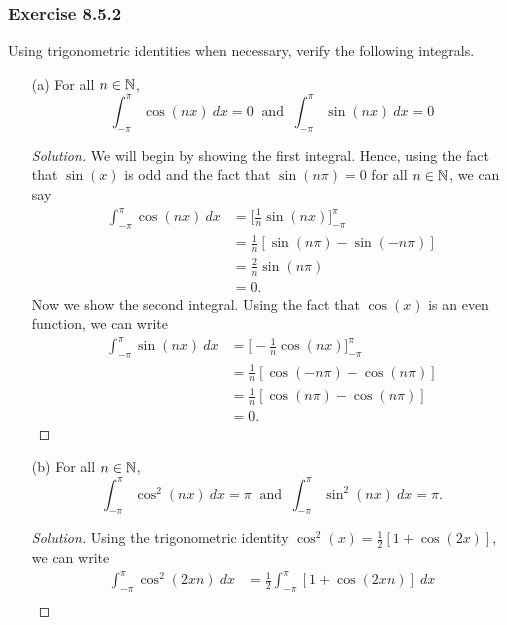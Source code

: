 \subsubsection{Exercise 8.5.2} Using trigonometric identities when necessary, verify the following integrals.
\begin{enumerate}
    \item[(a)] For all \( n \in \mathbb{N}  \), 
        \[  \int_{ - \pi  }^{ \pi  }  \cos(nx) \ dx = 0 \ \text{ and } \ \int_{ - \pi  }^{ \pi   } \sin(nx) \   dx = 0  \]
\begin{proof}[Solution]
    We will begin by showing the first integral. Hence, using the fact that \( \sin(x)  \) is odd and the fact that \( \sin(n \pi) = 0  \) for all \( n \in \mathbb{N}  \), we can say
    \begin{align*}
        \int_{ -\pi  }^{ \pi  } \cos(nx) \ dx &=  \Big[ \frac{ 1 }{ n }  \sin(nx)\Big]_{- \pi }^{\pi }  \\
                                              &= \frac{ 1 }{ n } [  \sin(n \pi ) - \sin(-n \pi)  ] \\
                                              &= \frac{ 2 }{ n }  \sin(n \pi) \\
                                              &= 0.
    \end{align*}
    Now we show the second integral. Using the fact that \( \cos(x) \) is an even function, we can write
    \begin{align*}
        \int_{ -\pi  }^{ \pi  } \sin(nx)  \ dx &= \Big[ -\frac{ 1 }{ n } \cos(nx) \Big]_{-\pi}^{\pi } \\
                                               &= \frac{ 1 }{ n } [  \cos(-n \pi) -\cos(n \pi)  ]  \\
                                               &= \frac{ 1 }{ n } [ \cos(n \pi) - \cos(n \pi )] \\
                                               &= 0.
    \end{align*}
\end{proof}
    \item[(b)] For all \( n \in \mathbb{N}  \),
        \[  \int_{ - \pi  }^{ \pi  }  \cos^{2}(nx) \ dx = \pi \ \text{ and } \ \int_{ - \pi  }^{ \pi   } \sin^{2}(nx) \   dx = \pi.  \]
        \begin{proof}[Solution]
            Using the trigonometric identity \( \cos^{2}(x) = \frac{ 1 }{ 2 }  [ 1 + \cos(2x)] \), we can write 
            \begin{align*}
                \int_{ - \pi  }^{ \pi  } \cos^{2}(2xn) \ dx &= \frac{ 1 }{ 2 } \int_{ - \pi  }^{ \pi } [ 1+ \cos(2xn) ]   \ dx \\

\end{align*}
\end{proof}
\end{enumerate}
